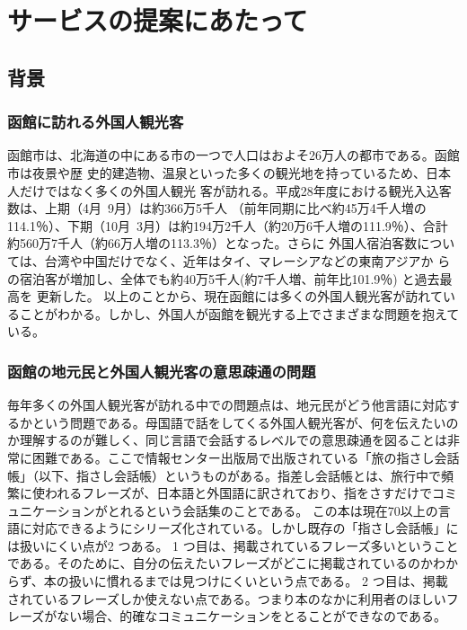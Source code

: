 \documentclass[11pt,papersize]{jsbook}
\begin{document}
\tableofcontents%


\mainmatter%




\chapter{サービスの提案にあたって}

\section{背景}

\subsection{函館に訪れる外国人観光客}
 函館市は、北海道の中にある市の一つで人口はおよそ26万人の都市である。函館市は夜景や歴
史的建造物、温泉といった多くの観光地を持っているため、日本人だけではなく多くの外国人観光
客が訪れる。平成28年度における観光入込客数は、上期（4月~9月）は約366万5千人
（前年同期に比べ約45万4千人増の114.1％）、下期（10月~3月）は約194万2千人（約20万6千人増の111.9％）、合計約560万7千人（約66万人増の113.3％）となった。さらに
外国人宿泊客数については、台湾や中国だけでなく、近年はタイ、マレーシアなどの東南アジアか
らの宿泊客が増加し、全体でも約40万5千人(約7千人増、前年比101.9％) と過去最高を
更新した\cite{b}。
以上のことから、現在函館には多くの外国人観光客が訪れていることがわかる。しかし、外国人が函館を観光する上でさまざまな問題を抱えている。

\subsection{函館の地元民と外国人観光客の意思疎通の問題}\label{sec:mokuteki}
 毎年多くの外国人観光客が訪れる中での問題点は、地元民がどう他言語に対応するかという問題である。母国語で話をしてくる外国人観光客が、何を伝えたいのか理解するのが難しく、同じ言語で会話するレベルでの意思疎通を図ることは非常に困難である。ここで情報センター出版局で出版されている「旅の指さし会話帳」（以下、指さし会話帳）というものがある。指差し会話帳とは、旅行中で頻繁に使われるフレーズが、日本語と外国語に訳されており、指をさすだけでコミュニケーションがとれるという会話集のことである。
この本は現在70以上の言語に対応できるようにシリーズ化されている。しかし既存の「指さし会話帳」には扱いにくい点が2 つある。
1 つ目は、掲載されているフレーズ多いということである。そのために、自分の伝えたいフレーズがどこに掲載されているのかわからず、本の扱いに慣れるまでは見つけにくいという点である。
2 つ目は、掲載されているフレーズしか使えない点である。つまり本のなかに利用者のほしいフレーズがない場合、的確なコミュニケーションをとることができなのである。
\end{document}
